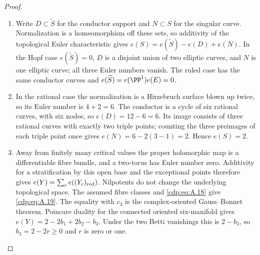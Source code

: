 \begin{proof}

\begin{enumerate}[label={$\langle1\rangle$\arabic*.},leftmargin=*]
\item Write $D\subset\widetilde S$ for the conductor support and $N\subset S$ for the singular curve. Normalization is a homeomorphism off these sets, so additivity of the topological Euler characteristic gives $e(S)=e(\widetilde S)-e(D)+e(N)$. In the Hopf case $e(\widetilde S)=0$, $D$ is a disjoint union of two elliptic curves, and $N$ is one elliptic curve; all three Euler numbers vanish. The ruled case has the same conductor curves and $e(\widetilde S)=e(\PP^1)e(E)=0$.

\item In the rational case the normalization is a Hirzebruch surface blown up twice, so its Euler number is $4+2=6$. The conductor is a cycle of six rational curves, with six nodes, so $e(D)=12-6=6$. Its image consists of three rational curves with exactly two triple points; counting the three preimages of each triple point once gives $e(N)=6-2(3-1)=2$. Hence $e(S)=2$.

\item Away from finitely many critical values the proper holomorphic map is a differentiable fibre bundle, and a two-torus has Euler number zero. Additivity for a stratification by this open base and the exceptional points therefore gives $e(Y)=\sum_c e((Y_c)_{\rm red})$. Nilpotents do not change the underlying topological space. The assumed fibre classes and \eqref{cdp:eq:A.18} give \eqref{cdp:eq:A.19}. The equality with $c_3$ is the complex-oriented Gauss--Bonnet theorem. Poincare duality for the connected oriented six-manifold gives $e(Y)=2-2b_1+2b_2-b_3$. Under the two Betti vanishings this is $2-b_3$, so $b_3=2-2r\ge0$ and $r$ is zero or one.

\end{enumerate}
\end{proof}
